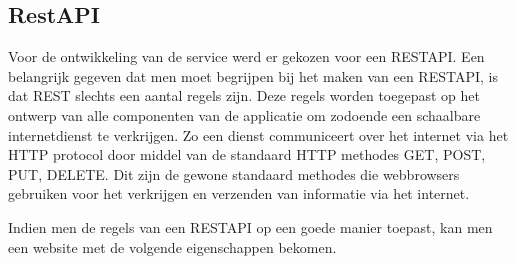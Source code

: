 \documentclass[a4paper,11pt]{article}
\begin{document}
\subsection{RestAPI}
%
%
%

Voor de ontwikkeling van de service werd er gekozen voor een RESTAPI. Een belangrijk gegeven dat men moet begrijpen bij het maken van een RESTAPI, is dat REST slechts een aantal regels zijn. Deze regels worden toegepast op het ontwerp van alle componenten van de applicatie om zodoende een schaalbare internetdienst te verkrijgen. Zo een dienst communiceert over het internet via het HTTP protocol door middel van de standaard HTTP methodes GET, POST, PUT, DELETE. Dit zijn de gewone standaard methodes die webbrowsers gebruiken voor het verkrijgen en verzenden van informatie via het internet. \cite{wiki:restapi}

Indien men de regels van een RESTAPI op een goede manier toepast, kan men een website met de volgende eigenschappen bekomen.
\end{document}
